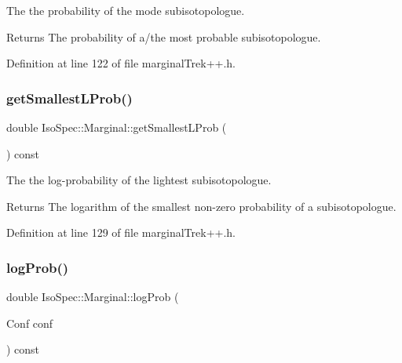 The the probability of the mode subisotopologue. 

\begin{DoxyReturn}{Returns}
The probability of a/the most probable subisotopologue. 
\end{DoxyReturn}


Definition at line 122 of file marginal\+Trek++.\+h.

\mbox{\label{class_iso_spec_1_1_marginal_a3f9607f51efcfdac1ca58a1467e3a5dc}} 
\subsubsection{\texorpdfstring{get\+Smallest\+L\+Prob()}{getSmallestLProb()}}
{\footnotesize\ttfamily double Iso\+Spec\+::\+Marginal\+::get\+Smallest\+L\+Prob (\begin{DoxyParamCaption}{ }\end{DoxyParamCaption}) const\hspace{0.3cm}{\ttfamily [inline]}}



The the log-\/probability of the lightest subisotopologue. 

\begin{DoxyReturn}{Returns}
The logarithm of the smallest non-\/zero probability of a subisotopologue. 
\end{DoxyReturn}


Definition at line 129 of file marginal\+Trek++.\+h.

\mbox{\label{class_iso_spec_1_1_marginal_a1974bb030ce70178da569214b4b93cb8}} 
\subsubsection{\texorpdfstring{log\+Prob()}{logProb()}}
{\footnotesize\ttfamily double Iso\+Spec\+::\+Marginal\+::log\+Prob (\begin{DoxyParamCaption}\item[{Conf}]{conf }\end{DoxyParamCaption}) const\hspace{0.3cm}{\ttfamily [inline]}}



